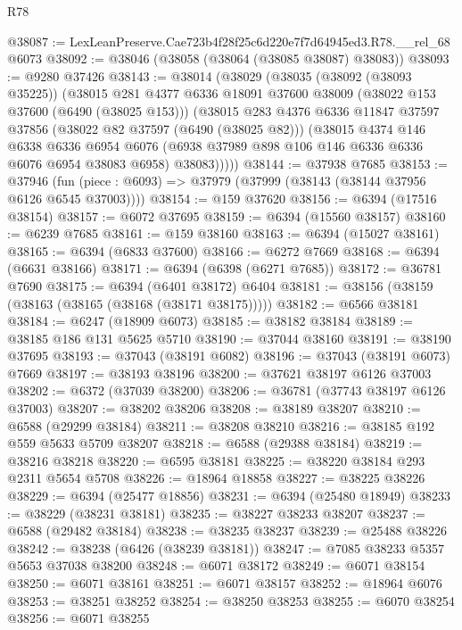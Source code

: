 \begin{lexlean}{R78}
\begin{coremodule}
@38087 := LexLeanPreserve.Cae723b4f28f25c6d220e7f7d64945ed3.R78.__rel_68 @6073
@38092 := @38046 (@38058 (@38064 (@38085 @38087) @38083))
@38093 := @9280 @37426
@38143 := @38014
    (@38029
      (@38035
        (@38092 (@38093 @35225))
        (@38015
          @281
          @4377
          @6336
          @18091
          @37600
          @38009
          (@38022 @153 @37600 (@6490 (@38025 @153)))
          (@38015
            @283
            @4376
            @6336
            @11847
            @37597
            @37856
            (@38022 @82 @37597 (@6490 (@38025 @82)))
            (@38015
              @4374
              @146
              @6338
              @6336
              @6954
              @6076
              (@6938 @37989 @898 @106 @146 @6336 @6336 @6076 @6954 @38083 @6958)
              @38083)))))
@38144 := @37938 @7685
@38153 := @37946
    (fun (piece : @6093) => @37979 (@37999 (@38143 (@38144 @37956 @6126 @6545 @37003))))
@38154 := @159 @37620
@38156 := @6394 (@17516 @38154)
@38157 := @6072 @37695
@38159 := @6394 (@15560 @38157)
@38160 := @6239 @7685
@38161 := @159 @38160
@38163 := @6394 (@15027 @38161)
@38165 := @6394 (@6833 @37600)
@38166 := @6272 @7669
@38168 := @6394 (@6631 @38166)
@38171 := @6394 (@6398 (@6271 @7685))
@38172 := @36781 @7690
@38175 := @6394 (@6401 @38172) @6404
@38181 := @38156 (@38159 (@38163 (@38165 (@38168 (@38171 @38175)))))
@38182 := @6566 @38181
@38184 := @6247 (@18909 @6073)
@38185 := @38182 @38184
@38189 := @38185 @186 @131 @5625 @5710
@38190 := @37044 @38160
@38191 := @38190 @37695
@38193 := @37043 (@38191 @6082)
@38196 := @37043 (@38191 @6073) @7669
@38197 := @38193 @38196
@38200 := @37621 @38197 @6126 @37003
@38202 := @6372 (@37039 @38200)
@38206 := @36781 (@37743 @38197 @6126 @37003)
@38207 := @38202 @38206
@38208 := @38189 @38207
@38210 := @6588 (@29299 @38184)
@38211 := @38208 @38210
@38216 := @38185 @192 @559 @5633 @5709 @38207
@38218 := @6588 (@29388 @38184)
@38219 := @38216 @38218
@38220 := @6595 @38181
@38225 := @38220 @38184 @293 @2311 @5654 @5708
@38226 := @18964 @18858
@38227 := @38225 @38226
@38229 := @6394 (@25477 @18856)
@38231 := @6394 (@25480 @18949)
@38233 := @38229 (@38231 @38181)
@38235 := @38227 @38233 @38207
@38237 := @6588 (@29482 @38184)
@38238 := @38235 @38237
@38239 := @25488 @38226
@38242 := @38238 (@6426 (@38239 @38181))
@38247 := @7085 @38233 @5357 @5653 @37038 @38200
@38248 := @6071 @38172
@38249 := @6071 @38154
@38250 := @6071 @38161
@38251 := @6071 @38157
@38252 := @18964 @6076
@38253 := @38251 @38252
@38254 := @38250 @38253
@38255 := @6070 @38254
@38256 := @6071 @38255

\end{coremodule}
\end{lexlean}
